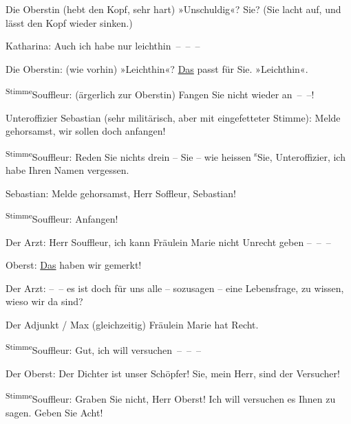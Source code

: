 \pstart
           Die Oberstin (hebt den Kopf, sehr hart) \introOben{}»\introOben{}Unschuldig\introOben{}«\introOben{}? Sie? (Sie lacht auf, und lässt den Kopf wieder
               sinken.)\pend
           
\pstart
           Katharina: Auch ich habe nur leichthin – – –\pend
           
\pstart
           Die Oberstin: (wie vorhin) »Leichthin«? \uline{Das} passt für
               Sie. »Leichthin«.\pend
           
\pstart
           \substVorne{}\textsuperscript{Stimme}\substDazwischen{}Souffleur\substHinten{}: (ärgerlich zur Oberstin) Fangen Sie nicht wieder an – –!\pend
           
\pstart
           Unteroffizier Sebastian (sehr militärisch, aber mit eingefetteter Stimme): Melde
               gehorsamst, wir sollen doch anfangen!\pend
           
\pstart
           \substVorne{}\textsuperscript{Stimme}\substDazwischen{}Souffleur\substHinten{}: Reden Sie nichts drein – Sie – wie heissen \substVorne{}\textsuperscript{s}\substDazwischen{}S\substHinten{}ie, Unteroffizier, ich habe Ihren Namen vergessen.\pend
           
\pstart
           {\pb}Sebastian: Melde gehorsamst, Herr
               Soffleur, Sebastian!\pend
           
\pstart
           \substVorne{}\textsuperscript{Stimme}\substDazwischen{}Souffleur\substHinten{}: Anfangen!\pend
           
\pstart
           Der Arzt: Herr Souffleur, ich kann Fräulein Marie nicht Unrecht geben – – –\pend
           
\pstart
           Oberst: \uline{Das} haben wir gemerkt!\pend
           
\pstart
           Der Arzt: – – es ist doch für uns alle – sozusagen – eine Lebensfrage, zu wissen,
               wieso wir da sind?\pend
           
\pstart
           Der Adjunkt / Max (gleichzeitig) Fräulein Marie hat Recht.\pend
           
\pstart
           \substVorne{}\textsuperscript{Stimme}\substDazwischen{}Souffleur\substHinten{}: Gut, ich will versuchen – – –\pend
           
\pstart
           Der Oberst: Der Dichter ist unser Schöpfer! Sie, mein Herr, sind der Versucher!\pend
           
\pstart
           \substVorne{}\textsuperscript{Stimme}\substDazwischen{}Souffleur\substHinten{}: Graben Sie nicht, Herr Oberst! Ich will versuchen es Ihnen zu sagen. Geben
               Sie Acht!\pend
           
